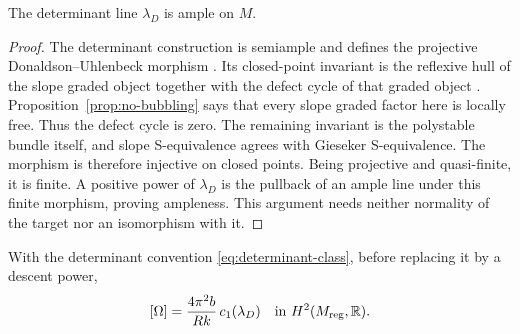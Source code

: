 \begin{lemma}\label{lem:ample}
The determinant line $\lambda_D$ is ample on $M$.
\end{lemma}

\begin{proof}
The determinant construction is semiample and defines
the projective Donaldson--Uhlenbeck morphism
\cite[Definition and Theorem~8.2.8]{hl97}. Its closed-point
invariant is the reflexive hull of the slope graded object
together with the defect cycle of that graded object
\cite[Theorem~8.2.11]{hl97}. Proposition~\ref{prop:no-bubbling}
says that every slope graded factor here is locally free.
Thus the defect cycle is zero. The remaining invariant
is the polystable bundle itself, and slope S-equivalence
agrees with Gieseker S-equivalence. The morphism is
therefore injective on closed points. Being projective
and quasi-finite, it is finite. A positive power of
$\lambda_D$ is the pullback of an ample line under this
finite morphism, proving ampleness. This argument needs
neither normality of the target nor an isomorphism with it.
\end{proof}

\begin{lemma}\label{lem:class}
With the determinant convention \eqref{eq:determinant-class},
before replacing it by a descent power,
\begin{equation}\label{eq:omega-class}
 [\Omega]=\frac{4\pi^2b}{Rk}\,c_1(\lambda_D)
       \quad\hbox{in }H^2(M_{\mathrm{reg}},\mathbb R).
\end{equation}
\end{lemma}

